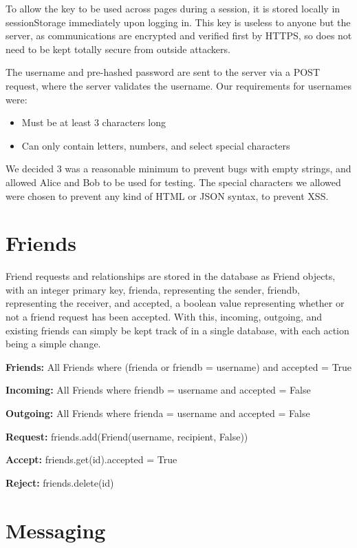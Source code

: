 \documentclass[12pt]{article}
\newcommand{\bryce}{\hfill\normalsize\sc [bkni0201]}
\begin{document}
To allow the key to be used across pages during a session, it is stored locally in sessionStorage immediately upon logging in. This key is useless to anyone but the server, as communications are encrypted and verified first by HTTPS, so does not need to be kept totally secure from outside attackers.

The username and pre-hashed password are sent to the server via a POST request, where the server validates the username. Our requirements for usernames were: 

\begin{itemize}
    \item Must be at least 3 characters long
    \item Can only contain letters, numbers, and select special characters
\end{itemize}

We decided 3 was a reasonable minimum to prevent bugs with empty strings, and allowed Alice and Bob to be used for testing. The special characters we allowed were chosen to prevent any kind of HTML or JSON syntax, to prevent XSS.

\section[Friends]{Friends \bryce}

Friend requests and relationships are stored in the database as Friend objects, with an integer primary key, frienda, representing the sender, friendb, representing the receiver, and accepted, a boolean value representing whether or not a friend request has been accepted. With this, incoming, outgoing, and existing friends can simply be kept track of in a single database, with each action being a simple change.

\textbf{Friends:} All Friends where (frienda or friendb = username) and accepted = True

\textbf{Incoming:} All Friends where friendb = username and accepted = False

\textbf{Outgoing:} All Friends where frienda = username and accepted = False

\textbf{Request:} friends.add(Friend(username, recipient, False))

\textbf{Accept:} friends.get(id).accepted = True

\textbf{Reject:} friends.delete(id)

\section[Messaging]{Messaging \bryce}
\end{document}

